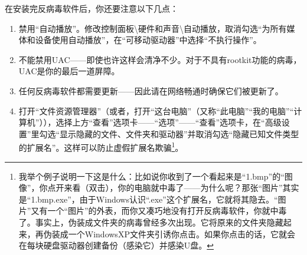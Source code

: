 \documentclass{book}
\begin{document}
在安装完反病毒软件后，你还要注意以下几点：
\begin{enumerate}
	\item 禁用“自动播放”。修改控制面板\textbackslash 硬件和声音\textbackslash 自动播放，取消勾选“为所有媒体和设备使用自动播放”，在“可移动驱动器”中选择“不执行操作”。
	\item 不能禁用UAC——即使也许这样会清净不少。对于不具有rootkit功能的病毒，UAC是你的最后一道屏障。
	\item 任何反病毒软件都需要更新——因此请在网络畅通时确保它们被更新了。
	\item 打开“文件资源管理器”（或者，打开“这台电脑”（又称“此电脑”“我的电脑”“计算机”）），选择上方“查看”选项卡——“选项”——“查看”选项卡，在“高级设置”里勾选“显示隐藏的文件、文件夹和驱动器”并取消勾选“隐藏已知文件类型的扩展名”。这样可以防止虚假扩展名欺骗\footnote{我举个例子说明一下这是什么：比如说你收到了一个看起来是“1.bmp”的“图像”，你点开来看（双击），你的电脑就中毒了——为什么呢？那张“图片”其实是“1.bmp.exe”，由于Windows认识“.exe”这个扩展名，它就将其隐去。“图片”又有一个“图片”的外表，而你又凑巧地没有打开反病毒软件，你就中毒了。事实上，伪装成文件夹的病毒曾经多次出现。它将原来的文件夹隐藏起来，再伪装成一个WindowsXP文件夹引诱你点击。如果你点击的话，它就会在每块硬盘驱动器创建备份（感染它）并感染U盘。}。
\end{enumerate}
\end{document}
